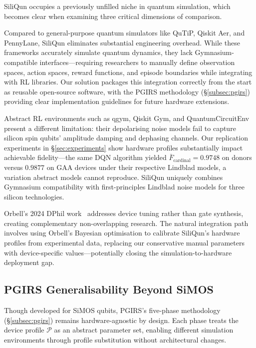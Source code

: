 SiliQun occupies a previously unfilled niche in quantum simulation, which becomes clear when examining three critical dimensions of comparison. 

Compared to general-purpose quantum simulators like QuTiP, Qiskit Aer, and PennyLane, SiliQun eliminates substantial engineering overhead. While these frameworks accurately simulate quantum dynamics, they lack Gymnasium-compatible interfaces—requiring researchers to manually define observation spaces, action spaces, reward functions, and episode boundaries while integrating with RL libraries. Our solution packages this integration correctly from the start as reusable open-source software, with the PGIRS methodology (\S\ref{subsec:pgirs}) providing clear implementation guidelines for future hardware extensions.

Abstract RL environments such as qgym, Qiskit Gym, and QuantumCircuitEnv present a different limitation: their depolarising noise models fail to capture silicon spin qubits' amplitude damping and dephasing channels. Our replication experiments in \S\ref{sec:experiments} show hardware profiles substantially impact achievable fidelity—the same DQN algorithm yielded $\bar{F}_\text{cardinal} = 0.9748$ on donors versus $0.9877$ on GAA devices under their respective Lindblad models, a variation abstract models cannot reproduce. SiliQun uniquely combines Gymnasium compatibility with first-principles Lindblad noise models for three silicon technologies.

Orbell's 2024 DPhil work~\cite{Orbell2024} addresses device tuning rather than gate synthesis, creating complementary non-overlapping research. The natural integration path involves using Orbell's Bayesian optimisation to calibrate SiliQun's hardware profiles from experimental data, replacing our conservative manual parameters with device-specific values—potentially closing the simulation-to-hardware deployment gap.

\subsection{PGIRS Generalisability Beyond SiMOS}
\label{subsec:generalisability}

Though developed for SiMOS qubits, PGIRS's five-phase methodology (\S\ref{subsec:pgirs}) remains hardware-agnostic by design. Each phase treats the device profile $\mathcal{P}$ as an abstract parameter set, enabling different simulation environments through profile substitution without architectural changes. 

